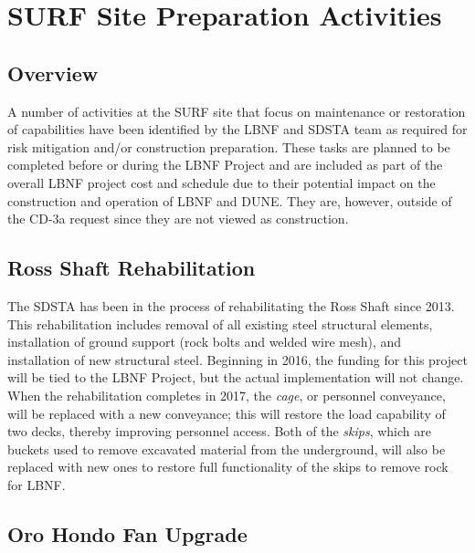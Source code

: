 \chapter{SURF Site Preparation Activities}
\label{ch:fscf-site-prep}


\section{Overview}
\label{ch:fscf-site-prep-overview}

A number of activities at the SURF site that focus on maintenance or restoration of capabilities have been identified by the LBNF and SDSTA team as required for risk mitigation and/or construction preparation.   These tasks are planned to be completed before or during the LBNF Project and are included as part of the overall LBNF project cost and schedule due to their potential impact on the construction and operation of LBNF and DUNE.  They are, however, outside of the CD-3a request since they are not viewed as construction.
 
\section{Ross Shaft Rehabilitation}
\label{ch:fscf-site-prep-rossrehab}

The SDSTA has been in the process of rehabilitating the Ross Shaft since 2013.  This rehabilitation includes removal of all existing steel structural elements, installation of ground support (rock bolts and welded wire mesh), and installation of new structural steel.  Beginning in 2016, the funding for this project will be tied to the LBNF Project, but the actual implementation will not change.  When the rehabilitation completes in 2017, %
the \textit{cage}, or personnel conveyance, will be replaced with a new conveyance; this will restore the load capability of two decks, thereby improving personnel access.  Both of the \textit{skips}, which are buckets used to remove excavated material from the underground, will also be replaced with new ones to restore full functionality of the skips to remove rock for LBNF.
 
\section{Oro Hondo Fan Upgrade}
\label{ch:fscf-site-prep-orohondofan}

